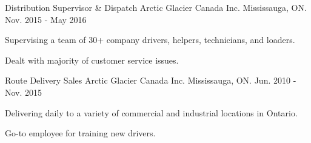 \begin{cventries}
  \cventry
    {Distribution Supervisor \& Dispatch} %
    {Arctic Glacier Canada Inc.} %
    {Mississauga, ON.} %
    {Nov. 2015 - May 2016} %
    {
      \begin{cvitems} %
        \item {Supervising a team of 30+ company drivers, helpers, technicians, and loaders.}
        \item {Dealt with majority of customer service issues.}
      \end{cvitems}
    }

  \cventry
    {Route Delivery Sales} %
    {Arctic Glacier Canada Inc.} %
    {Mississauga, ON.} %
    {Jun. 2010 - Nov. 2015} %
    {
    \begin{cvitems} %
      \item {Delivering daily to a variety of commercial and industrial locations in Ontario.}
      \item {Go-to employee for training new drivers.}
    \end{cvitems}
    }

\end{cventries}